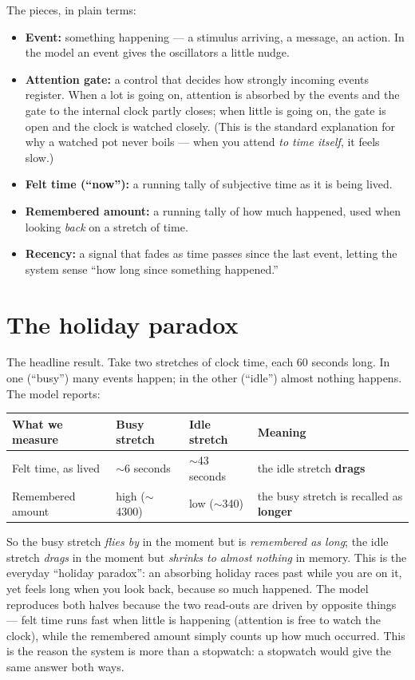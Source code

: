 \documentclass[11pt]{article}
\begin{document}
The pieces, in plain terms:

\begin{itemize}
\item \textbf{Event:} something happening --- a stimulus arriving, a message, an
action. In the model an event gives the oscillators a little nudge.
\item \textbf{Attention gate:} a control that decides how strongly incoming events
register. When a lot is going on, attention is absorbed by the events and the gate to
the internal clock partly closes; when little is going on, the gate is open and the
clock is watched closely. (This is the standard explanation for why a watched pot
never boils --- when you attend \emph{to time itself}, it feels slow.)
\item \textbf{Felt time (``now''):} a running tally of subjective time as it is being
lived.
\item \textbf{Remembered amount:} a running tally of how much happened, used when
looking \emph{back} on a stretch of time.
\item \textbf{Recency:} a signal that fades as time passes since the last event,
letting the system sense ``how long since something happened.''
\end{itemize}

\section{The holiday paradox}
\label{sec:dissoc}

The headline result. Take two stretches of clock time, each 60 seconds long. In one
(``busy'') many events happen; in the other (``idle'') almost nothing happens. The
model reports:

\begin{center}
\begin{tabular}{llll}
\hline
What we measure & Busy stretch & Idle stretch & Meaning \\
\hline
Felt time, as lived & $\sim$6 seconds & $\sim$43 seconds & the idle stretch \textbf{drags} \\
Remembered amount & high ($\sim$4300) & low ($\sim$340) & the busy stretch is recalled as \textbf{longer} \\
\hline
\end{tabular}
\end{center}

So the busy stretch \emph{flies by} in the moment but is \emph{remembered as long};
the idle stretch \emph{drags} in the moment but \emph{shrinks to almost nothing} in
memory. This is the everyday ``holiday paradox'': an absorbing holiday races past
while you are on it, yet feels long when you look back, because so much happened. The
model reproduces both halves because the two read-outs are driven by opposite things
--- felt time runs fast when little is happening (attention is free to watch the
clock), while the remembered amount simply counts up how much occurred. This is the
reason the system is more than a stopwatch: a stopwatch would give the same answer
both ways.
\end{document}
